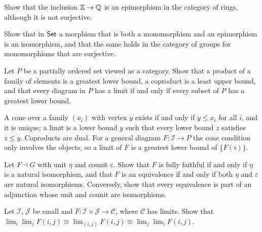 \begin{exercise}\label{categories:exercise-rings-epimorphism}
Show that the inclusion $\mathbb{Z} \to \mathbb{Q}$ is an epimorphism in the category of
rings, although it is not surjective.
\end{exercise}

\begin{exercise}\label{categories:exercise-sets-balanced}
Show that in $\mathsf{Set}$ a morphism that is both a monomorphism and an epimorphism is
an isomorphism, and that the same holds in the category of groups for
monomorphisms that are surjective.
\end{exercise}

\begin{exercise}\label{categories:exercise-poset-limits}
Let $P$ be a partially ordered set viewed as a category. Show that a product of
a family of elements is a greatest lower bound, a coproduct is a least upper
bound, and that every diagram in $P$ has a limit if and only if every subset of
$P$ has a greatest lower bound.
\end{exercise}

\begin{solution}
A cone over a family $(x_i)$ with vertex $y$ exists if and only if $y \leq x_i$
for all $i$, and it is unique; a limit is a lower bound $y$ such that every lower
bound $z$ satisfies $z \leq y$. Coproducts are dual. For a general diagram
$F \colon \mathcal{I} \to P$ the cone condition only involves the objects, so a limit
of $F$ is a greatest lower bound of $\{F(i)\}$.
\end{solution}

\begin{exercise}\label{categories:exercise-adjoint-equivalence}
Let $F \dashv G$ with unit $\eta$ and counit $\varepsilon$. Show that $F$ is fully
faithful if and only if $\eta$ is a natural isomorphism, and that $F$ is an
equivalence if and only if both $\eta$ and $\varepsilon$ are natural isomorphisms.
Conversely, show that every equivalence is part of an adjunction whose unit and
counit are isomorphisms.
\end{exercise}

\begin{exercise}\label{categories:exercise-limits-commute}
Let $\mathcal{I}$, $\mathcal{J}$ be small and $F \colon \mathcal{I} \times \mathcal{J} \to \mathcal{C}$,
where $\mathcal{C}$ has limits. Show that
$\lim_i \lim_j F(i, j) \cong \lim_{(i,j)} F(i, j) \cong \lim_j \lim_i F(i, j)$.
\end{exercise}

